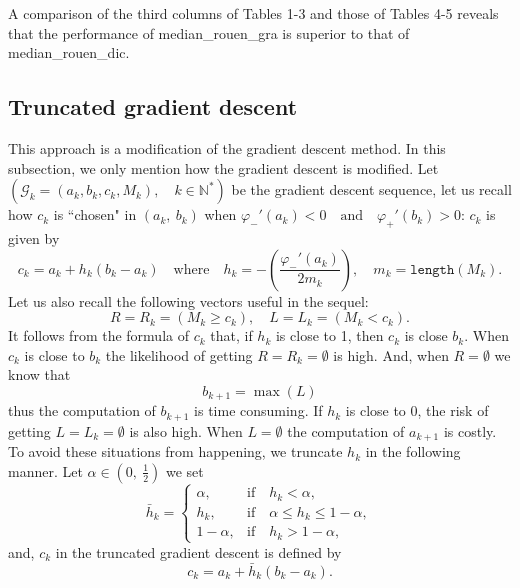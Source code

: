 \documentclass[
  11pt,
  a4paper,
]{article}
\newcommand\N{{\mathbb N}}
\begin{document}
A comparison of the third columns of Tables 1-3 and those of Tables 4-5 reveals that the performance of median\_rouen\_gra
is superior to that of median\_rouen\_dic. 



\subsection{Truncated gradient descent }\label{sec:4.2}

This approach is a modification of the gradient descent method. In this subsection, we only mention how the gradient descent is modified.
Let $\left(\mathscr{G}_k=\left(a_k,b_k,c_k,M_k \right),\quad k\in \N^*\right)$ be the gradient descent sequence, let us
recall how $c_k$ is ``chosen" in $(a_k,\ b_k)$ when  $ \varphi_{-}'(a_k)<0\quad\text{and}\quad \varphi_{+}'(b_k)>0$: $c_k$ is given
by 
\[
c_k=a_k+h_k (b_k-a_k)\quad\text{where}\quad h_k=-\left(\frac{\varphi_{-}'(a_k)}{2m_k}\right),\quad
m_k=\mathtt{length}(M_k).
\]
Let us also recall the following vectors useful in the sequel:
\[
R=R_k=\left(M_k\geq c_k\right),\quad  L=L_k=\left(M_k< c_k\right).
\]
It follows from the formula of $c_k$ that, if $h_k$ is close to 1, then $c_k$ is close $b_k.$ When $c_k$ is close
to $b_k$ the likelihood of getting $ R=R_k=\emptyset$ is high. And, when $R=\emptyset$ we know that
\[
b_{k+1}=\max(L)
\]
thus the computation of $b_{k+1}$  is time consuming. If $h_k$ is close to 0, the risk of getting $ L=L_k=\emptyset$
is also high. When $L=\emptyset$ the computation of $a_{k+1}$ is costly. To avoid these situations from happening,
we truncate $h_k$ in the following manner. Let $\alpha\in(0,\ \frac{1}{2})$ we set
\[
\bar{h}_k = \begin{cases} \alpha, & \text{if}\quad h_k < \alpha, \\ 
	h_k, & \text{if}\quad\alpha \leq h_k\leq 1-\alpha, \\
	1-\alpha, &\text{if}\quad h_k > 1-\alpha, 
\end{cases} 
\]
and, $c_k$ in the truncated gradient descent is defined by
\[
c_k=a_k+\bar{h}_k (b_k-a_k).
\]
\end{document}

